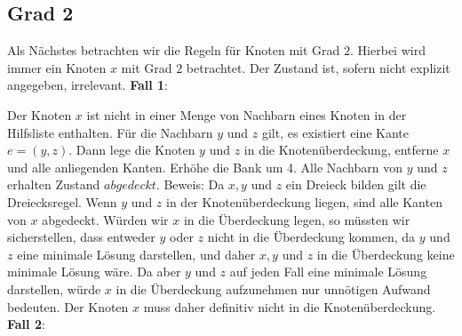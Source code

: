 \documentclass[12pt,onecolumn, notitlepage]{scrartcl}
\begin{document}
\subsection{Grad 2}
Als Nächstes betrachten wir die Regeln für Knoten mit Grad $2$. Hierbei wird immer ein Knoten $x$ mit Grad $2$ betrachtet. Der Zustand ist, sofern nicht explizit angegeben, irrelevant.\newline
\textbf{Fall 1}:\newline
\begin{center}
\end{center}
Der Knoten $x$ ist nicht in einer Menge von Nachbarn eines Knoten in der Hilfsliste enthalten. Für die Nachbarn $y$ und $z$ gilt, es existiert eine Kante $e = (y,z)$. Dann lege die Knoten $y$ und $z$ in die Knotenüberdeckung, entferne $x$ und alle anliegenden Kanten. Erhöhe die Bank um 4. Alle Nachbarn von $y$ und $z$ erhalten Zustand $abgedeckt$. \newline
Beweis: Da $x,y$ und $z$ ein Dreieck bilden gilt die Dreiecksregel. Wenn $y$ und $z$ in der Knotenüberdeckung liegen, sind alle Kanten von $x$ abgedeckt. Würden wir $x$ in die Überdeckung legen, so müssten wir sicherstellen, dass entweder $y$ oder $z$ nicht in die Überdeckung kommen, da $y$ und $z$ eine minimale Lösung darstellen, und daher $x,y$ und $z$ in die Überdeckung keine minimale Lösung wäre. Da aber $y$ und $z$ auf jeden Fall eine minimale Lösung darstellen, würde $x$ in die Überdeckung aufzunehmen nur unnötigen Aufwand bedeuten. Der Knoten $x$ muss daher definitiv nicht in die Knotenüberdeckung. \newline \newline
\textbf{Fall 2}: \newline
\begin{center}
\end{center}
\end{document}
